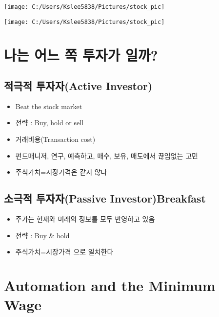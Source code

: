 \documentclass[
]{book}
\providecommand{\tightlist}{%
  \setlength{\itemsep}{0pt}\setlength{\parskip}{0pt}}
\begin{document}
\texttt{[image: C:/Users/Kslee5838/Pictures/stock\_pic]}

\texttt{[image: C:/Users/Kslee5838/Pictures/stock\_pic]}

\hypertarget{uxb098uxb294-uxc5b4uxb290-uxcabd-uxd22cuxc790uxac00-uxc77cuxae4c}{%
\chapter{나는 어느 쪽 투자가 일까?}\label{uxb098uxb294-uxc5b4uxb290-uxcabd-uxd22cuxc790uxac00-uxc77cuxae4c}}

\hypertarget{uxc801uxadf9uxc801-uxd22cuxc790uxc790active-investor}{%
\section{적극적 투자자(Active Investor)}\label{uxc801uxadf9uxc801-uxd22cuxc790uxc790active-investor}}

\begin{itemize}
\tightlist
\item
  Beat the stock market
\item
  전략 : Buy, hold or sell
\item
  거래비용(Transaction cost)
\item
  펀드매니저, 연구, 예측하고, 매수, 보유, 매도에서 끊임없는 고민
\item
  주식가치=시장가격은 같지 않다
\end{itemize}

\hypertarget{uxc18cuxadf9uxc801-uxd22cuxc790uxc790passive-investorbreakfast}{%
\section{소극적 투자자(Passive Investor)Breakfast}\label{uxc18cuxadf9uxc801-uxd22cuxc790uxc790passive-investorbreakfast}}

\begin{itemize}
\tightlist
\item
  주가는 현재와 미래의 정보를 모두 반영하고 있음
\item
  전략 : Buy \& hold
\item
  주식가치=시장가격 으로 일치한다
\end{itemize}

\hypertarget{automation-and-the-minimum-wage}{%
\chapter{Automation and the Minimum Wage}\label{automation-and-the-minimum-wage}}
\end{document}
